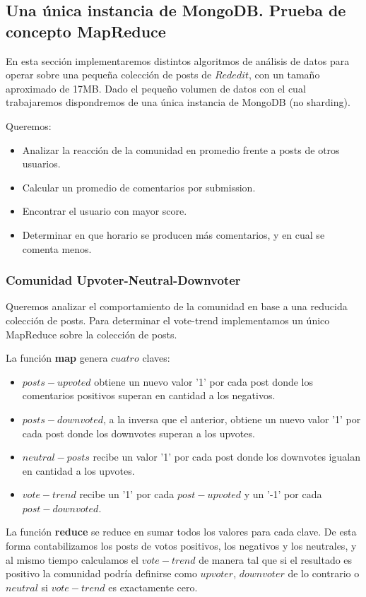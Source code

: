 \subsection{Una única instancia de MongoDB. Prueba de concepto MapReduce}


En esta sección implementaremos distintos algoritmos de análisis de datos para operar sobre una peque\~na colección de posts de $Rededit$, con un tama\~no aproximado de 17MB. Dado el peque\~no volumen de datos con el cual trabajaremos dispondremos de una única instancia de MongoDB (no sharding).


Queremos:
\begin{itemize}
	\item Analizar la reacción de la comunidad en promedio frente a posts de otros usuarios.
	\item Calcular un promedio de comentarios por submission.
	\item Encontrar el usuario con mayor score.
	\item Determinar en que horario se producen más comentarios, y en cual se comenta menos.
\end{itemize}


\subsubsection{Comunidad Upvoter-Neutral-Downvoter}

Queremos analizar el comportamiento de la comunidad en base a una reducida colección de posts. Para determinar el vote-trend implementamos un único MapReduce sobre la colección de posts.


La función \textbf{map} genera $cuatro$ claves:
\begin{itemize}
	\item $posts-upvoted$ obtiene un nuevo valor '1' por cada post donde los comentarios positivos superan en cantidad a los negativos.
	\item $posts-downvoted$, a la inversa que el anterior, obtiene un nuevo valor '1' por cada post donde los downvotes superan a los upvotes.
	\item $neutral-posts$ recibe un valor '1' por cada post donde los downvotes igualan en cantidad a los upvotes.
	\item $vote-trend$ recibe un '1' por cada $post-upvoted$ y un '-1' por cada $post-downvoted$.
\end{itemize}


La función \textbf{reduce} se reduce en sumar todos los valores para cada clave. De esta forma contabilizamos los posts de votos positivos, los negativos y los neutrales, y al mismo tiempo calculamos el $vote-trend$ de manera tal que si el resultado es positivo la comunidad podría definirse como $upvoter$, $downvoter$ de lo contrario o $neutral$ si $vote-trend$ es exactamente cero.

